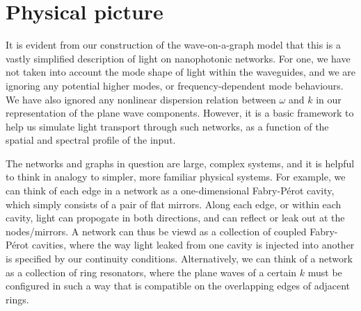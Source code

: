 \pagebreak

\section{Physical picture}
\label{sec:physical_picture}
It is evident from our construction of the wave-on-a-graph model that this is a vastly simplified description of light on nanophotonic networks. For one, we have not taken into account the mode shape of light within the waveguides, and we are ignoring any potential higher modes, or frequency-dependent mode behaviours. We have also ignored any nonlinear dispersion relation between $\omega$ and $k$ in our representation of the plane wave components. However, it is a basic framework to help us simulate light transport through such networks, as a function of the spatial and spectral profile of the input.

The networks and graphs in question are large, complex systems, and it is helpful to think in analogy to simpler, more familiar physical systems. For example, we can think of each edge in a network as a one-dimensional Fabry-P\'erot cavity, which simply consists of a pair of flat mirrors. Along each edge, or within each cavity, light can propogate in both directions, and can reflect or leak out at the nodes/mirrors. A network can thus be viewd as a collection of coupled Fabry-P\'erot cavities, where the way light leaked from one cavity is injected into another is specified by our continuity conditions. Alternatively, we can think of a network as a collection of ring resonators, where the plane waves of a certain $k$ must be configured in such a way that is compatible on the overlapping edges of adjacent rings.


